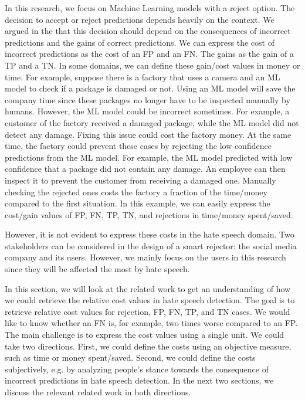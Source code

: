 In this research, we focus on Machine Learning models with a reject option. The decision to accept or reject predictions depends heavily on the context. We argued in the  that this decision should depend on the consequences of incorrect predictions and the gains of correct predictions. We can express the cost of incorrect predictions as the cost of an FP and an FN. The gains as the gain of a TP and a TN. In some domains, we can define these gain/cost values in money or time. For example, suppose there is a factory that uses a camera and an ML model to check if a package is damaged or not. Using an ML model will save the company time since these packages no longer have to be inspected manually by humans. However, the ML model could be incorrect sometimes. For example, a customer of the factory received a damaged package, while the ML model did not detect any damage. Fixing this issue could cost the factory money. At the same time, the factory could prevent these cases by rejecting the low confidence predictions from the ML model. For example, the ML model predicted with low confidence that a package did not contain any damage. An employee can then inspect it to prevent the customer from receiving a damaged one. Manually checking the rejected ones costs the factory a fraction of the time/money compared to the first situation. In this example, we can easily express the cost/gain values of FP, FN, TP, TN, and rejections in time/money spent/saved.

However, it is not evident to express these costs in the hate speech domain. Two stakeholders can be considered in the design of a smart rejector: the social media company and its users. However, we mainly focus on the users in this research since they will be affected the most by hate speech.

In this section, we will look at the related work to get an understanding of how we could retrieve the relative cost values in hate speech detection. The goal is to retrieve relative cost values for rejection, FP, FN, TP, and TN cases. We would like to know whether an FN is, for example, two times worse compared to an FP. The main challenge is to express the cost values using a single unit. We could take two directions. First, we could define the costs using an objective measure, such as time or money spent/saved. Second, we could define the costs subjectively, e.g. by analyzing people’s stance towards the consequence of incorrect predictions in hate speech detection. In the next two sections, we discuss the relevant related work in both directions.

